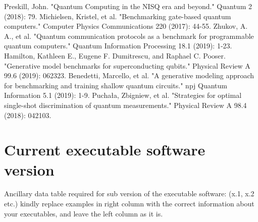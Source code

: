 \documentclass[preprint,12pt, a4paper]{elsarticle}
\newcommand{\1}{{\rm 1\hspace{-0.9mm}l}}
\begin{document}

%
%   
%  


\begin{thebibliography}{00}

 Preskill, John. "Quantum Computing in the NISQ era and beyond." Quantum 2 (2018): 79.
 Michielsen, Kristel, et al. "Benchmarking gate-based quantum computers." Computer Physics Communications 220 (2017): 44-55.
 Zhukov, A. A., et al. "Quantum communication protocols as a benchmark for programmable quantum computers." Quantum Information Processing 18.1 (2019): 1-23.
 Hamilton, Kathleen E., Eugene F. Dumitrescu, and Raphael C. Pooser. "Generative model benchmarks for superconducting qubits." Physical Review A 99.6 (2019): 062323.
 Benedetti, Marcello, et al. "A generative modeling approach for benchmarking and training shallow quantum circuits." npj Quantum Information 5.1 (2019): 1-9.
 Puchała, Zbigniew, et al. "Strategies for optimal single-shot discrimination of quantum measurements." Physical Review A 98.4 (2018): 042103.
\end{thebibliography}

\section*{Current executable software version}
\label{}

Ancillary data table required for sub version of the executable software: (x.1, x.2 etc.) kindly replace examples in right column with the correct information about your executables, and leave the left column as it is.
\end{document}
